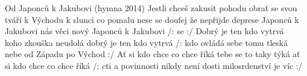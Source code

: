\begin{TEXT}{Od Japonců k Jakubovi (hymna 2014)}
\SLOKA* Jestli chceš zakusit pohodu\NL
obra\v{t} se svou tváří k Východu\NL
k slunci co pomalu nese se\NL
doufej že nepřijde deprese
\SLOKA {} Japonců k Jakubovi\NL
{} nás věci nový\NL
{} Japonců k Jakubovi\NL
/:  \NL
{} se \NL
{}   :/
\SLOKA Dobrý je ten kdo vytrvá\NL
koho zkouška neudolá\NL
dobrý je ten kdo vytrvá\NL
/: kdo ovládá sebe\NL
tomu tleská nebe\NL
od Západu po Východ :/
\SLOKA A\v{t} si kdo chce co chce říká\NL
tebe se to taky týká\NL
a\v{t} si kdo chce co chce říká\NL
/: cti a povinnosti\NL
nikdy není dosti\NL
milosrdenství je víc :/
\end{TEXT}
